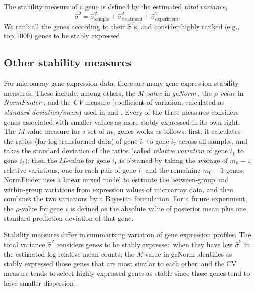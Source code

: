 \documentclass[11pt, a4paper]{article}
\begin{document}
The stability measure of a gene is defined by the estimated \textit{total variance},
 \begin{equation}\label{eq:totalVariance}
 \hat \sigma^2 =\hat\sigma_{\text{sample}}^2+ \hat\sigma_{\text{treatment}}^2+ \hat\sigma_{\text{experiment}}^2.
 \end{equation}
We rank all the genes according to their $\hat\sigma^2$s, and consider highly ranked (e.g., top 1000) genes to be stably expressed. 

\subsection{Other stability measures}\label{subsection:OtherStabilityMeasure}
For microarray gene expression data, there are many gene expression stability measures. These include, among others, the \textit{$M$-value} in \textit{geNorm} \citep{vandesompele2002accurate}, the \textit{$\rho$ value} in \textit{NormFinder} \citep{andersen2004normalization}, and the \textit{CV} measure (coefficient of variation, calculated as \textit{standard deviation/mean}) used in \cite{czechowski2005genome} and \cite{dekkers2012identification}. Every of the three measures considers genes associated with smaller values as more stably expressed in its own right. The $M$-value measure for a set of $m_0$ genes works as follows: first, it calculates the ratios (for log-transformed data) of gene $i_1$ to gene $i_2$ across all samples, and takes the standard deviation of the ratios (called \textit{relative variation} of gene $i_1$ to gene $i_2$); then the $M$-value for gene $i_1$ is obtained by taking the average of $m_0-1$ relative variations, one for each pair of gene $i_1$ and the remaining $m_0-1$ genes. NormFinder uses a linear mixed model to estimate the between-group and within-group variations from expression values of microarray data, and then combines the two variations by a Bayesian formulation. For a future experiment, the $\rho$-value for gene $i$ is defined as the absolute value of posterior mean plus one standard prediction deviation of that gene. 
	
Stability measures differ in summarizing variation of gene expression profiles. The total variance $\hat{\sigma}^2$ considers genes to be stably expressed when they have low $\hat{\sigma}^2$ in the estimated log relative mean counts; the $M$-value in geNorm identifies as stably expressed those genes that are most similar to each other; and the CV measure tends to select highly expressed genes as stable since those genes tend to have smaller dispersion \citep{hruz2011refgenes}. 
\end{document}
